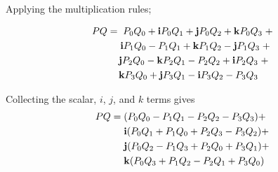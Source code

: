Applying the multiplication rules;

\begin{align*}
PQ = {}& \;                P_0Q_0 + \bm{\mathrm{i}} P_0Q_1 + \bm{\mathrm{j}} P_0Q_2 + \bm{\mathrm{k}}P_0Q_3 \; + \\
       &     \bm{\mathrm{i}} P_1Q_0 - P_1Q_1               + \bm{\mathrm{k}}P_1Q_2 - \bm{\mathrm{j}} P_1Q_3 \; + \\
       & \!  \bm{\mathrm{j}} P_2Q_0 - \bm{\mathrm{k}}P_2Q_1 - P_2Q_2               + \bm{\mathrm{i}} P_2Q_3 \; + \\
       & \!  \bm{\mathrm{k}}P_3Q_0 + \bm{\mathrm{j}} P_3Q_1 - \bm{\mathrm{i}} P_3Q_2 - P_3Q_3
\end{align*}

Collecting the scalar, \(i\), \(j\), and \(k\) terms gives
\begin{align*}
PQ = {} &          (P_0Q_0 - P_1Q_1 - P_2Q_2 - P_3Q_3) + \\
        & \bm{\mathrm{i}} (P_0Q_1 + P_1Q_0 + P_2Q_3 - P_3Q_2) + \\
        & \bm{\mathrm{j}} (P_0Q_2 - P_1Q_3 + P_2Q_0 + P_3Q_1) + \\
        & \bm{\mathrm{k}} (P_0Q_3 + P_1Q_2 - P_2Q_1 + P_3Q_0)
\end{align*}